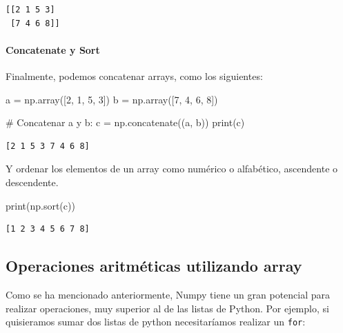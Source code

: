 \documentclass[
  letterpaper,
  DIV=11,
  numbers=noendperiod]{scrreprt}
\let\oldparagraph\paragraph
\renewcommand{\paragraph}[1]{\oldparagraph{#1}\mbox{}}
\newenvironment{Shaded}{\begin{snugshade}}{\end{snugshade}}
\newcommand{\BuiltInTok}[1]{\textcolor[rgb]{0.00,0.23,0.31}{#1}}
\newcommand{\CommentTok}[1]{\textcolor[rgb]{0.37,0.37,0.37}{#1}}
\newcommand{\DecValTok}[1]{\textcolor[rgb]{0.68,0.00,0.00}{#1}}
\newcommand{\NormalTok}[1]{\textcolor[rgb]{0.00,0.23,0.31}{#1}}
\newcommand{\OperatorTok}[1]{\textcolor[rgb]{0.37,0.37,0.37}{#1}}
\begin{document}
\begin{verbatim}
[[2 1 5 3]
 [7 4 6 8]]
\end{verbatim}

\paragraph{Concatenate y Sort}\label{concatenate-y-sort}

Finalmente, podemos concatenar arrays, como los siguientes:

\begin{Shaded}
\begin{Highlighting}[]
\NormalTok{a }\OperatorTok{=}\NormalTok{ np.array([}\DecValTok{2}\NormalTok{, }\DecValTok{1}\NormalTok{, }\DecValTok{5}\NormalTok{, }\DecValTok{3}\NormalTok{])}
\NormalTok{b }\OperatorTok{=}\NormalTok{ np.array([}\DecValTok{7}\NormalTok{, }\DecValTok{4}\NormalTok{, }\DecValTok{6}\NormalTok{, }\DecValTok{8}\NormalTok{])}

\CommentTok{\# Concatenar a y b:}
\NormalTok{c }\OperatorTok{=}\NormalTok{ np.concatenate((a, b))}
\BuiltInTok{print}\NormalTok{(c)}
\end{Highlighting}
\end{Shaded}

\begin{verbatim}
[2 1 5 3 7 4 6 8]
\end{verbatim}

Y ordenar los elementos de un array como numérico o alfabético,
ascendente o descendente.

\begin{Shaded}
\begin{Highlighting}[]
\BuiltInTok{print}\NormalTok{(np.sort(c))}
\end{Highlighting}
\end{Shaded}

\begin{verbatim}
[1 2 3 4 5 6 7 8]
\end{verbatim}

\subsection{\texorpdfstring{Operaciones aritméticas utilizando
\textbf{array}}{Operaciones aritméticas utilizando array}}\label{operaciones-aritmuxe9ticas-utilizando-array}

Como se ha mencionado anteriormente, Numpy tiene un gran potencial para
realizar operaciones, muy superior al de las listas de Python. Por
ejemplo, si quisieramos sumar dos listas de python necesitaríamos
realizar un \texttt{for}:
\end{document}
